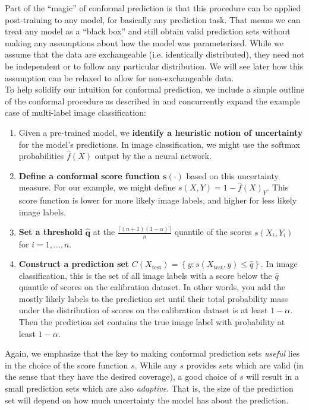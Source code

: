 \documentclass[a4paper, 12pt]{article}
\begin{document}
Part of the ``magic'' of conformal prediction is that this procedure can be applied
post-training to any model, for basically any prediction task. That means we can treat any
model as a ``black box'' and still obtain valid prediction sets without making any assumptions
about how the model was parameterized. While we assume that the data are exchangeable (i.e. identically distributed),
they need not be independent or to follow any particular distribution. We will see later
how this assumption can be relaxed to allow for non-exchangeable data. \\
To help solidify our intuition for conformal prediction, we include a simple outline of the conformal
procedure as described in \autocite{angelopoulosGentleIntroductionConformal2022} and concurrently expand the example case of
multi-label image classification:
\begin{enumerate}
    \item Given a pre-trained model, we \textbf{identify a heuristic notion of uncertainty} for the model's predictions. In image classification, we might use the softmax probabilities $\hat{f}(X)$ output by the a neural network.
    \item \textbf{Define a conformal score function $\bm{s(\cdot)}$} based on this uncertainty measure. For our example, we might define $s(X, Y)=1-\hat{f}(X)_Y$. This score function is lower for more likely image labels, and higher for less likely image labels.
    \item \textbf{Set a threshold} $\bm{\hat{q}}$ at the $ \frac{\lceil (n+1)(1-\alpha) \rceil }{n}$ quantile of the scores $s(X_i, Y_i)$ for $i = 1, \ldots, n$.
    \item \textbf{Construct a prediction set} $C(X_{\text{test}}) = \left\{ y: s(X_{\text{test}}, y) \leq \hat{q} \right\}$.
          In image classification, this is the set of all image labels with a score below the $\hat{q}$ quantile of scores on the calibration dataset. In other words,
          you add the mostly likely labels to the prediction set until their total probability mass under the distribution of scores on the calibration dataset is at least $1-\alpha$. Then
          the prediction set contains the true image label with probability at least $1-\alpha$.
\end{enumerate}
Again, we emphasize that the key to making conformal prediction sets \textit{useful}
lies in the choice of the score function $s$. While any $s$ provides sets which are valid
(in the sense that they have the desired coverage), a good choice of $s$ will result in a small prediction sets
which are also \textit{adaptive}. That is, the size of the prediction set will depend on how much uncertainty
the model has about the prediction.
\end{document}
